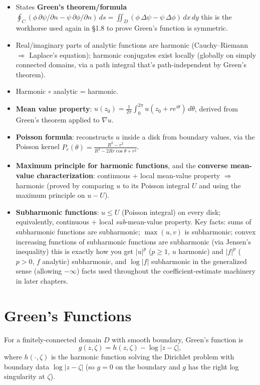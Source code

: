 \documentclass[
]{book}
\providecommand{\tightlist}{%
  \setlength{\itemsep}{0pt}\setlength{\parskip}{0pt}}
\theoremstyle{definition}
\theoremstyle{definition}
\theoremstyle{definition}
\theoremstyle{definition}
\theoremstyle{remark}
\begin{document}
\begin{itemize}
\tightlist
\item
  States \textbf{Green's theorem/formula} \(\oint_C(\phi\,\partial\psi/\partial n - \psi\,\partial\phi/\partial n)\,ds = \iint_D(\phi\,\Delta\psi - \psi\,\Delta\phi)\,dx\,dy\) this is the workhorse used again in §1.8 to prove Green's function is symmetric.
\item
  Real/imaginary parts of analytic functions are harmonic (Cauchy--Riemann \(\Rightarrow\) Laplace's equation); harmonic conjugates exist locally (globally on simply connected domains, via a path integral that's path-independent by Green's theorem).
\item
  Harmonic \(\circ\) analytic = harmonic.
\item
  \textbf{Mean value property}: \(u(z_0) = \frac{1}{2\pi}\int_0^{2\pi} u(z_0+re^{i\theta})\,d\theta\), derived from Green's theorem applied to \(\nabla u\).
\item
  \textbf{Poisson formula}: reconstructs \(u\) inside a disk from boundary values, via the Poisson kernel \(P_r(\theta) = \frac{R^2-r^2}{R^2-2Rr\cos\theta+r^2}\).
\item
  \textbf{Maximum principle for harmonic functions}, and the \textbf{converse mean-value characterization}: continuous + local mean-value property \(\Rightarrow\) harmonic (proved by comparing \(u\) to its Poisson integral \(U\) and using the maximum principle on \(u - U\)).
\item
  \textbf{Subharmonic functions}: \(u \le U\) (Poisson integral) on every disk; equivalently, continuous + local \emph{sub}-mean-value property. Key facts: sums of subharmonic functions are subharmonic; \(\max(u,v)\) is subharmonic; convex increasing functions of subharmonic functions are subharmonic (via Jensen's inequality) this is exactly how you get \(|u|^p\) (\(p\ge 1\), \(u\) harmonic) and \(|f|^p\) (\(p>0\), \(f\) analytic) subharmonic, and \(\log|f|\) subharmonic in the generalized sense (allowing \(-\infty\)) facts used throughout the coefficient-estimate machinery in later chapters.
\end{itemize}

\section{Green's Functions}\label{greens-functions}

For a finitely-connected domain \(D\) with smooth boundary, Green's function is
\[g(z,\zeta) = h(z,\zeta) - \log|z-\zeta|,\]
where \(h(\cdot,\zeta)\) is the harmonic function solving the Dirichlet problem with boundary data \(\log|z-\zeta|\) (so \(g=0\) on the boundary and \(g\) has the right log singularity at \(\zeta\)).
\end{document}
